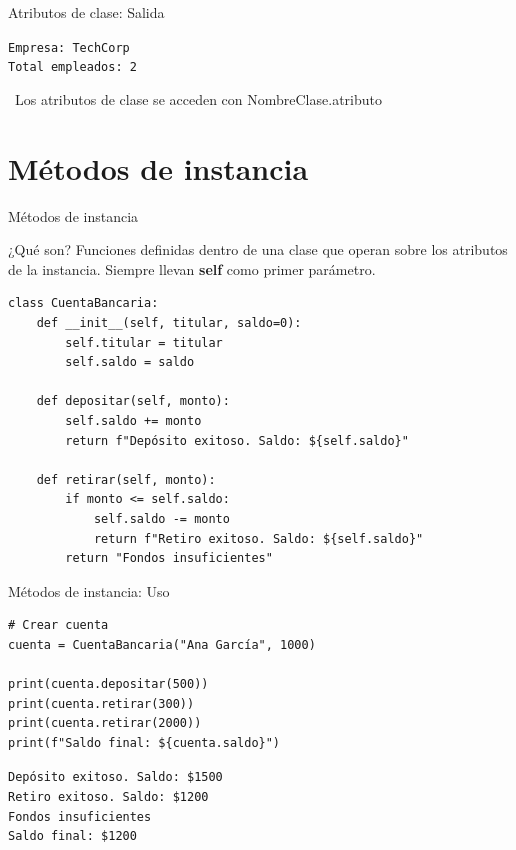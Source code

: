 \documentclass{beamer}
\begin{document}
\begin{frame}[fragile]{Atributos de clase: Salida \faArrowCircleRight}
\begin{tcolorbox}[colback=green!10,colframe=green,title={\small\faArrowCircleRight \ Salida},coltitle=fg0,left=3pt,right=3pt,top=3pt,bottom=3pt,boxsep=2pt]
\small\texttt{Empresa: TechCorp\\
Total empleados: 2}
\end{tcolorbox}

\vspace{0.3cm}
\begin{notebox}
\small\faInfoCircle\ Los atributos de clase se acceden con NombreClase.atributo
\end{notebox}
\end{frame}

\section{Métodos de instancia}

\begin{frame}[fragile]{Métodos de instancia \faTools}
\begin{conceptbox}{¿Qué son?}
Funciones definidas dentro de una clase que operan sobre los atributos de la instancia. Siempre llevan \textbf{self} como primer parámetro.
\end{conceptbox}

\begin{lstlisting}
class CuentaBancaria:
    def __init__(self, titular, saldo=0):
        self.titular = titular
        self.saldo = saldo
    
    def depositar(self, monto):
        self.saldo += monto
        return f"Depósito exitoso. Saldo: ${self.saldo}"
    
    def retirar(self, monto):
        if monto <= self.saldo:
            self.saldo -= monto
            return f"Retiro exitoso. Saldo: ${self.saldo}"
        return "Fondos insuficientes"
\end{lstlisting}
\end{frame}

\begin{frame}[fragile]{Métodos de instancia: Uso \faPlay}
\begin{lstlisting}
# Crear cuenta
cuenta = CuentaBancaria("Ana García", 1000)

print(cuenta.depositar(500))
print(cuenta.retirar(300))
print(cuenta.retirar(2000))
print(f"Saldo final: ${cuenta.saldo}")
\end{lstlisting}

\vspace{-0.2cm}
\begin{tcolorbox}[colback=green!10,colframe=green,title={\small\faArrowCircleRight \ Salida},coltitle=fg0,left=3pt,right=3pt,top=3pt,bottom=3pt,boxsep=2pt]
\small\texttt{Depósito exitoso. Saldo: \$1500\\
Retiro exitoso. Saldo: \$1200\\
Fondos insuficientes\\
Saldo final: \$1200}
\end{tcolorbox}
\end{frame}
\end{document}
